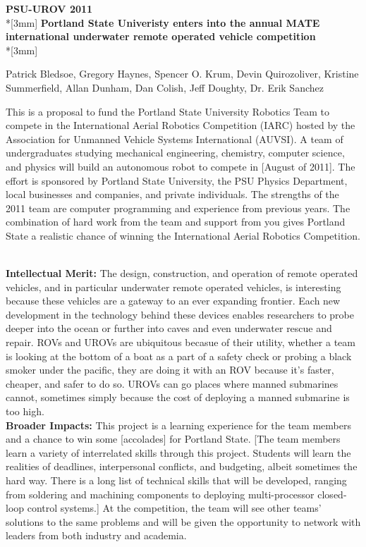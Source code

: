 \documentclass{proposalnsf}
\begin{document}
\begin{center}
{\Large{\bf PSU-UROV 2011}}\\*[3mm]
{\bf Portland State Univeristy enters into the annual MATE international underwater remote operated vehicle competition} \\*[3mm]

Patrick Bledsoe, Gregory Haynes, Spencer O. Krum, Devin Quirozoliver, Kristine Summerfield,
 Allan Dunham, Dan Colish, Jeff Doughty, Dr. Erik Sanchez

\end{center}


This is a  proposal to fund the Portland State University Robotics Team to compete in the  International Aerial Robotics Competition (IARC) hosted by the Association for Unmanned Vehicle Systems International (AUVSI). A team of undergraduates studying mechanical engineering,
 chemistry, computer science, and physics will build an autonomous robot to compete in [August of 2011]. The effort is sponsored by Portland State University, 
the PSU Physics Department, local businesses and companies, and private individuals.  The strengths of the 2011 team are computer programming and experience from previous years. The combination of hard work 
from the team and support from you gives Portland State a realistic chance of winning the International Aerial Robotics Competition.  



\ \\
\noindent
{\bf Intellectual Merit:}
The design, construction, and operation of remote operated vehicles, and in particular underwater remote operated vehicles, is interesting
because these vehicles are a gateway to an ever expanding frontier. Each new development in the technology behind these devices enables 
researchers to probe deeper into the ocean or further into caves and even underwater rescue and repair. ROVs and UROVs are ubiquitous becasue 
of their utility, whether a team is looking at the bottom of a boat as a part of a safety check or probing a black smoker under the pacific, 
they are doing it with an ROV because it's faster, cheaper, and safer to do so. UROVs can go places where manned submarines cannot, sometimes 
simply because the cost of deploying a manned submarine is too high.  
\ \\

\noindent
{\bf Broader Impacts:}
This project is a learning experience for the team members and a chance to win some [accolades] for Portland State. [The team members learn 
a variety of interrelated skills through this project. Students will learn the realities of deadlines, interpersonal conflicts, and budgeting, albeit 
sometimes the hard way. There is a long list of technical skills that will be developed, ranging from soldering and machining components to deploying 
multi-processor closed-loop control systems.] At the competition, the team will see other teams' solutions to the same problems and will be
 given the opportunity to network with leaders from both industry and academia. 
\end{document}
